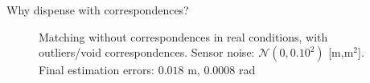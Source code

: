 \begin{frame}[noframenumbering]{Why dispense with correspondences?}

  \begin{figure}\vspace{1cm}
    \caption{Matching without correspondences in real conditions, with
             outliers/void correspondences. Sensor noise:
             $\mathcal{N}(0, 0.10^2)$ [m,m$^2$]. Final estimation errors: $0.018$ m,
             $0.0008$ rad}
  \end{figure}

\end{frame}
